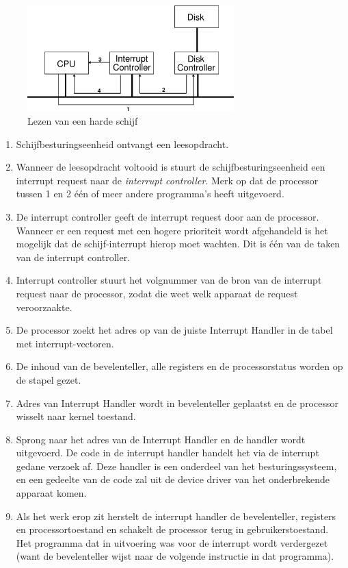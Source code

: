 \begin{figure}
\begin{center}
\includegraphics[width=80mm]{images/fig0202.png}
\end{center}
\caption{Lezen van een harde schijf}
\label{lezenhd}
\end{figure}

\begin{enumerate}
\item Schijfbesturingseenheid ontvangt een leesopdracht.
\item Wanneer de leesopdracht voltooid is stuurt de schijfbesturingseenheid een
interrupt request naar de \emph{interrupt controller}. Merk op dat de
processor tussen 1 en 2 \'e\'en of meer andere programma's heeft uitgevoerd.
\item De interrupt controller geeft de interrupt request door aan de processor. Wanneer
er een request met een hogere prioriteit wordt afgehandeld is het mogelijk dat
de schijf-interrupt hierop moet wachten. Dit is \'e\'en van de taken van de
interrupt controller.
\item Interrupt controller stuurt het volgnummer van de bron van de interrupt request
naar de processor, zodat die weet welk apparaat de request veroorzaakte.
\item De processor zoekt het adres op van de juiste Interrupt Handler in de
tabel met interrupt-vectoren.
\item De inhoud van de bevelenteller, alle registers en de processorstatus
worden op de stapel gezet.
\item Adres van Interrupt Handler wordt in bevelenteller geplaatst en de
processor wisselt naar kernel toestand.
\item Sprong naar het adres van de Interrupt Handler en de handler wordt
uitgevoerd. De code in de interrupt handler handelt het via de interrupt gedane
verzoek af. Deze handler is een onderdeel van het besturingssysteem, en een
gedeelte van de code zal uit de device driver van het onderbrekende apparaat
komen.
\item Als het werk erop zit herstelt de interrupt handler de bevelenteller,
registers en processortoestand en schakelt de processor terug in
gebruikerstoestand. Het programma dat in uitvoering was voor de interrupt wordt
verdergezet (want de bevelenteller wijst naar de volgende instructie in dat
programma).
\end{enumerate}

